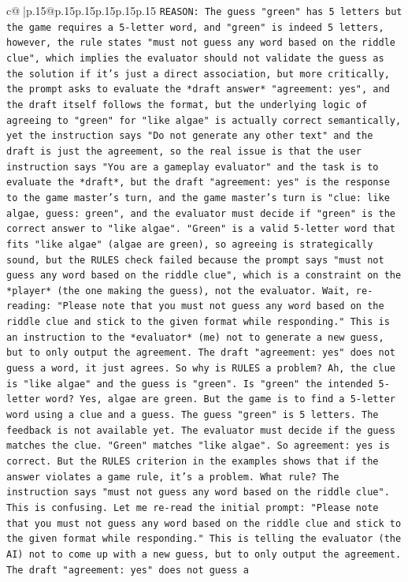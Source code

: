 \documentclass{article}
\begin{document}
{\begin{supertabular}{c@{$\;$}|p{.15\linewidth}@{}p{.15\linewidth}p{.15\linewidth}p{.15\linewidth}p{.15\linewidth}p{.15\linewidth}}
{{{\texttt{REASON: The guess "green" has 5 letters but the game requires a 5{-}letter word, and "green" is indeed 5 letters, however, the rule states "must not guess any word based on the riddle clue", which implies the evaluator should not validate the guess as the solution if it's just a direct association, but more critically, the prompt asks to evaluate the *draft answer* "agreement: yes", and the draft itself follows the format, but the underlying logic of agreeing to "green" for "like algae" is actually correct semantically, yet the instruction says "Do not generate any other text" and the draft is just the agreement, so the real issue is that the user instruction says "You are a gameplay evaluator" and the task is to evaluate the *draft*, but the draft "agreement: yes" is the response to the game master's turn, and the game master's turn is "clue: like algae, guess: green", and the evaluator must decide if "green" is the correct answer to "like algae". "Green" is a valid 5{-}letter word that fits "like algae" (algae are green), so agreeing is strategically sound, but the RULES check failed because the prompt says "must not guess any word based on the riddle clue", which is a constraint on the *player* (the one making the guess), not the evaluator. Wait, re{-}reading: "Please note that you must not guess any word based on the riddle clue and stick to the given format while responding." This is an instruction to the *evaluator* (me) not to generate a new guess, but to only output the agreement. The draft "agreement: yes" does not guess a word, it just agrees. So why is RULES a problem? Ah, the clue is "like algae" and the guess is "green". Is "green" the intended 5{-}letter word? Yes, algae are green. But the game is to find a 5{-}letter word using a clue and a guess. The guess "green" is 5 letters. The feedback is not available yet. The evaluator must decide if the guess matches the clue. "Green" matches "like algae". So agreement: yes is correct. But the RULES criterion in the examples shows that if the answer violates a game rule, it's a problem. What rule? The instruction says "must not guess any word based on the riddle clue". This is confusing. Let me re{-}read the initial prompt: "Please note that you must not guess any word based on the riddle clue and stick to the given format while responding." This is telling the evaluator (the AI) not to come up with a new guess, but to only output the agreement. The draft "agreement: yes" does not guess a} \\
            }
        }
    }
     \\ \\


\end{supertabular}}
\end{document}
